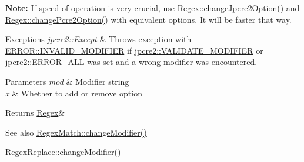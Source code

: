 {\bfseries Note\+:} If speed of operation is very crucial, use \hyperlink{classjpcre2_1_1Regex_ab8e0b1a49eeb1077ba54cf3b5292c95e_ab8e0b1a49eeb1077ba54cf3b5292c95e}{Regex\+::change\+Jpcre2\+Option()} and \hyperlink{classjpcre2_1_1Regex_ae5bde8008cc5a700163ca3162dbd5823_ae5bde8008cc5a700163ca3162dbd5823}{Regex\+::change\+Pcre2\+Option()} with equivalent options. It will be faster that way. 
\begin{DoxyExceptions}{Exceptions}
{\em \hyperlink{classjpcre2_1_1Except}{jpcre2\+::\+Except}} & Throws exception with \hyperlink{namespacejpcre2_1_1ERROR_a4b2998984439438fa9da8d7043909bc2_a4b2998984439438fa9da8d7043909bc2a4115340549b623f4e2da285bf0aa9bff}{E\+R\+R\+O\+R\+::\+I\+N\+V\+A\+L\+I\+D\+\_\+\+M\+O\+D\+I\+F\+I\+ER} if \hyperlink{namespacejpcre2_a85c143271501e383843f45b9999c2f00_a85c143271501e383843f45b9999c2f00a9124b768bcae4d51430aa7f26126f387}{jpcre2\+::\+V\+A\+L\+I\+D\+A\+T\+E\+\_\+\+M\+O\+D\+I\+F\+I\+ER} or \hyperlink{namespacejpcre2_a85c143271501e383843f45b9999c2f00_a85c143271501e383843f45b9999c2f00a6fec35fc9fdd8a606bed430c1816c552}{jpcre2\+::\+E\+R\+R\+O\+R\+\_\+\+A\+LL} was set and a wrong modifier was encountered. \\
\hline
\end{DoxyExceptions}

\begin{DoxyParams}{Parameters}
{\em mod} & Modifier string \\
\hline
{\em x} & Whether to add or remove option \\
\hline
\end{DoxyParams}
\begin{DoxyReturn}{Returns}
\hyperlink{classjpcre2_1_1Regex}{Regex}\& 
\end{DoxyReturn}
\begin{DoxySeeAlso}{See also}
\hyperlink{classjpcre2_1_1RegexMatch_a877be3123d789020d259939bc79e8cfe_a877be3123d789020d259939bc79e8cfe}{Regex\+Match\+::change\+Modifier()} 

\hyperlink{classjpcre2_1_1RegexReplace_a0a2dc39fc28e6f7fe0a5d638f5891bdb_a0a2dc39fc28e6f7fe0a5d638f5891bdb}{Regex\+Replace\+::change\+Modifier()} 
\end{DoxySeeAlso}
\hypertarget{classjpcre2_1_1Regex_ae5bde8008cc5a700163ca3162dbd5823_ae5bde8008cc5a700163ca3162dbd5823}{}\label{classjpcre2_1_1Regex_ae5bde8008cc5a700163ca3162dbd5823_ae5bde8008cc5a700163ca3162dbd5823} 
